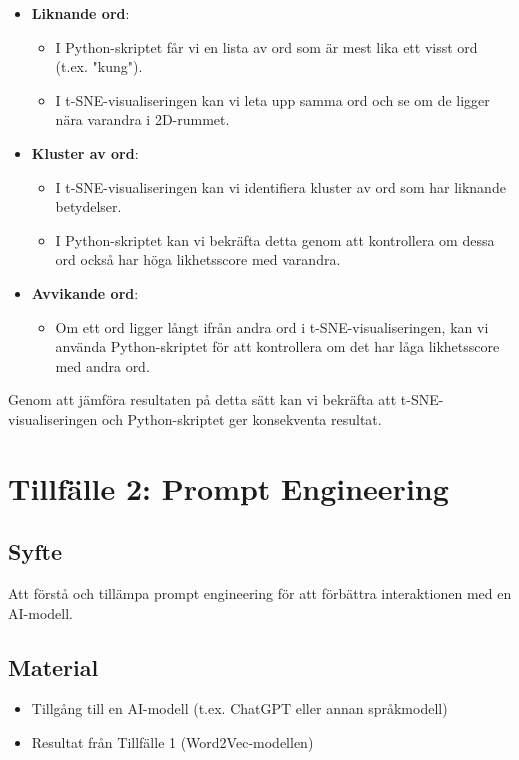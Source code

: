 \documentclass[a4paper, 12pt]{article}
\begin{document}
\begin{itemize}
    \item \textbf{Liknande ord}:
        \begin{itemize}
            \item I Python-skriptet får vi en lista av ord som är mest lika ett visst ord (t.ex. "kung").
            \item I t-SNE-visualiseringen kan vi leta upp samma ord och se om de ligger nära varandra i 2D-rummet.
        \end{itemize}
    
    \item \textbf{Kluster av ord}:
        \begin{itemize}
            \item I t-SNE-visualiseringen kan vi identifiera kluster av ord som har liknande betydelser.
            \item I Python-skriptet kan vi bekräfta detta genom att kontrollera om dessa ord också har höga likhetsscore med varandra.
        \end{itemize}
    
    \item \textbf{Avvikande ord}:
        \begin{itemize}
            \item Om ett ord ligger långt ifrån andra ord i t-SNE-visualiseringen, kan vi använda Python-skriptet för att kontrollera om det har låga likhetsscore med andra ord.
        \end{itemize}
\end{itemize}

\noindent
Genom att jämföra resultaten på detta sätt kan vi bekräfta att t-SNE-visualiseringen och Python-skriptet ger konsekventa resultat.

\break

\section{Tillfälle 2: Prompt Engineering}

\subsection{Syfte}
Att förstå och tillämpa prompt engineering för att förbättra interaktionen med en AI-modell.

\subsection{Material}
\begin{itemize}
    \item Tillgång till en AI-modell (t.ex. ChatGPT eller annan språkmodell)
    \item Resultat från Tillfälle 1 (Word2Vec-modellen)
\end{itemize}
\end{document}
